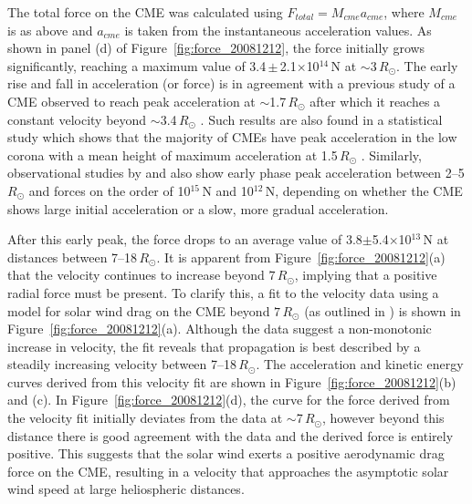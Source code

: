 The total force on the CME was calculated using $F_{total}=M_{cme}a_{cme}$, where $M_{cme}$ is as above and $a_{cme}$ is taken from the instantaneous acceleration values. As shown in panel (d) of Figure~\ref{fig:force_20081212}, the force initially grows significantly, reaching a maximum value of 3.4\,$\pm$\,2.1$\times$10$^{14}$\,N at $\sim$3\,$R_
{\odot}$. The early rise and fall in acceleration (or force) is in agreement with a previous study of a CME observed to reach peak acceleration at $\sim$1.7\,$R_{\odot}$ after which it reaches a constant velocity beyond $\sim$3.4\,$R_{\odot}$ \citep{gallagher03}.  Such results are also found in a statistical study which shows that the majority of CMEs have peak acceleration in the low corona with a mean height of maximum acceleration at 1.5\,$R_{\odot}$ 
\citep{bein2011}. Similarly, observational studies by \citet{zhang2001} and \citet{zhang2004} also show early phase peak acceleration between 2--5\,$R_{\odot}$ and forces on the order of 10$^{15}$\,N and 10$^{12}$\,N, depending on whether the CME shows large initial acceleration or a slow, more gradual acceleration.

After this early peak, the force drops to an average value of 3.8$\pm$5.4$\times$10$^{13}$\,N at distances between 7--18\,$R_{\odot}$. It is apparent from Figure~\ref{fig:force_20081212}(a) that the velocity continues to increase beyond $7\,R_{\odot}$, implying that a positive radial force must be present. To clarify this, a fit to the velocity data using a model for solar wind drag on the CME beyond $7\,R_{\odot}$ (as outlined in \citet{byrne2010}) is shown in Figure~\ref{fig:force_20081212}(a). Although the data suggest a non-monotonic increase in velocity, the fit reveals that propagation is best described by a steadily increasing velocity between 7--18\,$R_{\odot}$. The acceleration and kinetic energy curves derived from this velocity fit are shown in Figure~\ref{fig:force_20081212}(b) and (c). In Figure~\ref{fig:force_20081212}(d), the curve for the force derived from the velocity fit initially deviates from the data at $\sim$7\,$R_{\odot}$, however beyond this distance there is good agreement with the data and the derived force is entirely positive.  This suggests that the solar wind exerts a positive aerodynamic drag force on the CME, resulting in a velocity that approaches the asymptotic solar wind speed at large heliospheric distances. 


